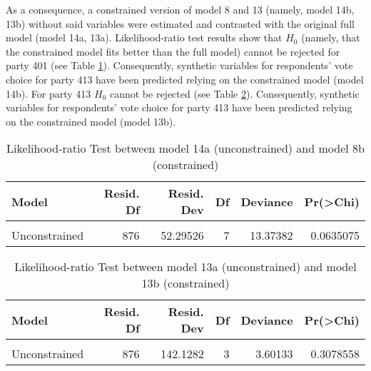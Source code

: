 \documentclass[
]{article}
\begin{document}
As a consequence, a constrained version of model 8 and 13 (namely, model 14b, 13b) without said variables were estimated and contrasted with the original full model (model 14a, 13a). Likelihood-ratio test results show
that \(H_0\) (namely, that the constrained model fits better than the full model) cannot be rejected for
party 401 (see Table \ref{table:lrtest_1_hr}). Consequently, synthetic variables
for respondents' vote choice for party 413 have been predicted relying on the constrained model (model 14b).
For party 413 \(H_0\) cannot be rejected (see Table \ref{table:lrtest_2_hr}). Consequently, synthetic variables
for respondents' vote choice for party 413 have been predicted relying on the constrained model (model 13b).

\begin{table}[!h]

\caption{\label{tab:unnamed-chunk-33}Likelihood-ratio Test between model 14a (unconstrained) and model 8b (constrained)
                  \label{table:lrtest_1_hr}}
\centering
\begin{tabular}[t]{l|r|r|r|r|r}
\hline
Model & Resid. Df & Resid. Dev & Df & Deviance & Pr(>Chi)\\
\hline
\cellcolor{gray!6}{Constrained} & \cellcolor{gray!6}{883} & \cellcolor{gray!6}{65.66908} & \cellcolor{gray!6}{} & \cellcolor{gray!6}{} & \cellcolor{gray!6}{}\\
\hline
Unconstrained & 876 & 52.29526 & 7 & 13.37382 & 0.0635075\\
\hline
\end{tabular}
\end{table}

\begin{table}[!h]

\caption{\label{tab:unnamed-chunk-33}Likelihood-ratio Test between model 13a (unconstrained) and model 13b (constrained)
                  \label{table:lrtest_2_hr}}
\centering
\begin{tabular}[t]{l|r|r|r|r|r}
\hline
Model & Resid. Df & Resid. Dev & Df & Deviance & Pr(>Chi)\\
\hline
\cellcolor{gray!6}{Constrained} & \cellcolor{gray!6}{879} & \cellcolor{gray!6}{145.7295} & \cellcolor{gray!6}{} & \cellcolor{gray!6}{} & \cellcolor{gray!6}{}\\
\hline
Unconstrained & 876 & 142.1282 & 3 & 3.60133 & 0.3078558\\
\hline
\end{tabular}
\end{table}
\end{document}
